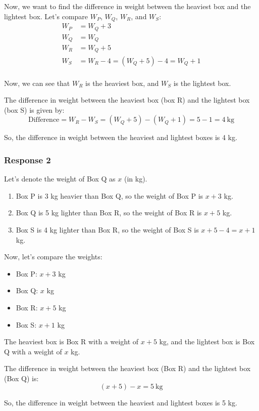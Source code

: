 \documentclass[12pt, a4paper]{article}
\begin{document}
Now, we want to find the difference in weight between the heaviest box and the lightest box. Let's compare $W_P$, $W_Q$, $W_R$, and $W_S$:
\begin{align*}
    W_P &= W_Q + 3 \\
    W_Q &= W_Q \\
    W_R &= W_Q + 5 \\
    W_S &= W_R - 4 = (W_Q + 5) - 4 = W_Q + 1 \\
\end{align*}

Now, we can see that $W_R$ is the heaviest box, and $W_S$ is the lightest box.

The difference in weight between the heaviest box (box R) and the lightest box (box S) is given by:
$$\text{Difference} = W_R - W_S = (W_Q + 5) - (W_Q + 1) = 5 - 1 = 4 \ \text{kg}$$

So, the difference in weight between the heaviest and lightest boxes is 4 kg.

\subsubsection*{Response 2}
Let's denote the weight of Box Q as $x$ (in kg).
\begin{enumerate}
    \item Box P is 3 kg heavier than Box Q, so the weight of Box P is $x+3$ kg.
    \item Box Q is 5 kg lighter than Box R, so the weight of Box R is $x+5$ kg.
    \item Box S is 4 kg lighter than Box R, so the weight of Box S is $x+5-4=x+1$ kg.
\end{enumerate}

Now, let's compare the weights:
\begin{itemize}
    \item Box P: $x+3$ kg
    \item Box Q: $x$ kg
    \item Box R: $x+5$ kg
    \item Box S: $x+1$ kg
\end{itemize}

The heaviest box is Box R with a weight of $x+5$ kg, and the lightest box is Box Q with a weight of $x$ kg.

The difference in weight between the heaviest box (Box R) and the lightest box (Box Q) is:
$$(x+5)-x=5 \ \text{kg}$$

So, the difference in weight between the heaviest and lightest boxes is 5 kg.
\end{document}
